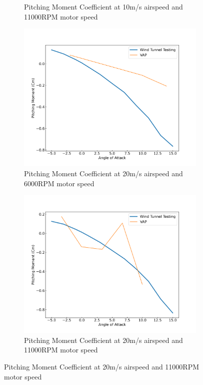 \begin{figure}[H]
\begin{subfigure}[b]{0.467\textwidth}
        \caption{Pitching Moment Coefficient at 10m/s airspeed and 11000RPM motor speed}
        \label{fig:VAP_Cm_10ms_11000}
    \end{subfigure}
    \begin{subfigure}[b]{0.467\textwidth}
        \centering
        \includegraphics[width=\textwidth]{05_Results/VAP/tractor/Cm/20ms_6000RPM_Cm.png}
        \caption{Pitching Moment Coefficient at 20m/s airspeed and 6000RPM motor speed}
        \label{fig:VAP_Cm_20ms_6000}
    \end{subfigure}
    \begin{subfigure}[b]{0.467\textwidth}
        \centering
        \includegraphics[width=\textwidth]{05_Results/VAP/tractor/Cm/20ms_11000RPM_Cm.png}
        \caption{Pitching Moment Coefficient at 20m/s airspeed and 11000RPM motor speed}
        \label{fig:VAP_Cm_20ms_11000}
    \end{subfigure}
\end{figure}



